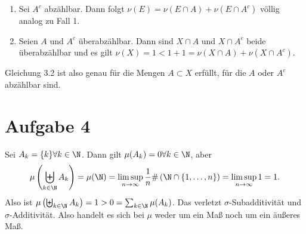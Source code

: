 \documentclass{article}
\begin{document}
\begin{enumerate}[(a)]
\begin{enumerate}[1.]
\begin{enumerate}
            \end{enumerate}
            \item Sei $A^c$ abzählbar. Dann folgt $\nu(E) = \nu(E \cap A) + \nu(E \cap A^c)$ völlig analog zu Fall 1.
            \item Seien $A$ und $A^c$ überabzählbar. Dann sind $X \cap A$ und $X \cap A^c$ beide überabzählbar und es gilt $\nu(X) = 1 < 1 + 1 = \nu(X \cap A) + \nu(X \cap A^c)$.
        \end{enumerate}
    \end{enumerate}
    Gleichung 3.2 ist also genau für die Mengen $A\subset X$ erfüllt, für die $A$ oder $A^c$ abzählbar sind.
    \section*{Aufgabe 4}
    Sei $A_k = \{k\} \forall k \in\N$. Dann gilt $\mu(A_k) = 0\forall k\in \N$, aber 
    \[
        \mu\left(\biguplus_{k\in \N} A_k\right) = \mu(\N) = \limsup\limits_{n \to \infty} \frac{1}{n}\#\left(\N \cap \{1,\dots, n\}\right) = \limsup\limits_{n \to \infty} 1 = 1.
    \] Also ist $\mu\left(\biguplus_{k\in \N} A_k\right) = 1 > 0 = \sum_{k\in \N} \mu(A_k)$. Das verletzt $\sigma$-Subadditivität und $\sigma$-Additivität. Also handelt es sich bei $\mu$ weder um ein Maß noch um ein äußeres Maß.
\end{document}
